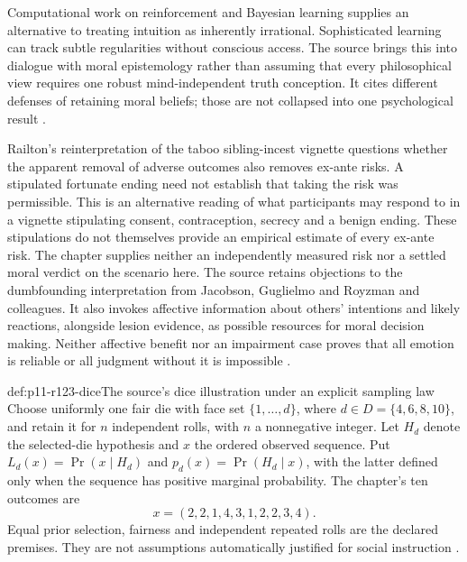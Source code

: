 Computational work on reinforcement and Bayesian learning supplies an
alternative to treating intuition as inherently irrational. Sophisticated
learning can track subtle regularities without conscious access. The
source brings this into dialogue with moral epistemology rather than
assuming that every philosophical view requires one robust mind-independent
truth conception. It cites different defenses of retaining moral beliefs;
those are not collapsed into one psychological result
\parencite[pp.~705--706]{WiegmannSauer2021MoralJudgment}.

Railton's reinterpretation of the taboo sibling-incest vignette questions
whether the apparent removal of adverse outcomes also removes ex-ante
risks. A stipulated fortunate ending need not establish that taking the
risk was permissible. This is an alternative reading of what participants
may respond to in a vignette stipulating consent, contraception, secrecy
and a benign ending. These stipulations do not themselves provide an
empirical estimate of every ex-ante risk. The chapter supplies neither
an independently measured risk nor a settled moral verdict on the
scenario here. The source retains objections
to the dumbfounding interpretation from Jacobson, Guglielmo and Royzman
and colleagues. It also invokes affective information about others'
intentions and likely reactions, alongside lesion evidence, as possible
resources for moral decision making. Neither affective benefit nor an
impairment case proves that all emotion is reliable or all judgment
without it is impossible \parencite[p.~706]{WiegmannSauer2021MoralJudgment}.

\begin{hbdefinition}{def:p11-r123-dice}{The source's dice illustration under an explicit sampling law}
Choose uniformly one fair die with face set \(\{1,\ldots,d\}\), where
\(d\in D=\{4,6,8,10\}\), and retain it for \(n\) independent
rolls, with \(n\) a nonnegative integer. Let \(H_d\) denote the selected-die hypothesis and \(x\) the
ordered observed sequence. Put \(L_d(x)=\Pr(x\mid H_d)\) and
\(p_d(x)=\Pr(H_d\mid x)\), with the latter defined only when
the sequence has positive marginal probability.
The chapter's ten outcomes are
\[
                    x=(2,2,1,4,3,1,2,2,3,4).
\]
Equal prior selection, fairness and independent repeated rolls are the
declared premises. They are not assumptions automatically justified for
social instruction \parencite[p.~706]{WiegmannSauer2021MoralJudgment}.
\end{hbdefinition}

